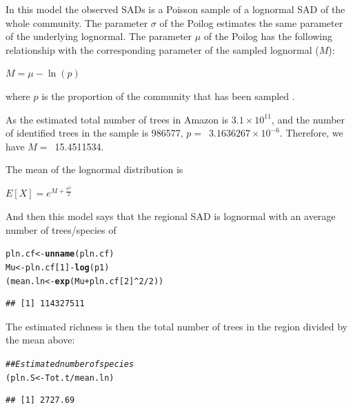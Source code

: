 \documentclass[12pt, A4]{article}\usepackage[]{graphicx}\usepackage[]{color}
\makeatletter
\newcommand{\hlnum}[1]{\textcolor[rgb]{0.686,0.059,0.569}{#1}}%
\newcommand{\hlcom}[1]{\textcolor[rgb]{0.678,0.584,0.686}{\textit{#1}}}%
\newcommand{\hlopt}[1]{\textcolor[rgb]{0,0,0}{#1}}%
\newcommand{\hlstd}[1]{\textcolor[rgb]{0.345,0.345,0.345}{#1}}%
\newcommand{\hlkwb}[1]{\textcolor[rgb]{0.69,0.353,0.396}{#1}}%
\newcommand{\hlkwd}[1]{\textcolor[rgb]{0.737,0.353,0.396}{\textbf{#1}}}%
\newenvironment{kframe}{%
 \def\at@end@of@kframe{}%
 \ifinner\ifhmode%
  \def\at@end@of@kframe{\end{minipage}}%
  \begin{minipage}{\columnwidth}%
 \fi\fi%
 \def\FrameCommand##1{\hskip\@totalleftmargin \hskip-\fboxsep
 \colorbox{shadecolor}{##1}\hskip-\fboxsep
     \hskip-\linewidth \hskip-\@totalleftmargin \hskip\columnwidth}%
 \MakeFramed {\advance\hsize-\width
   \@totalleftmargin\z@ \linewidth\hsize
   \@setminipage}}%
 {\par\unskip\endMakeFramed%
 \at@end@of@kframe}
\newenvironment{knitrout}{}{} %
\makeatother
\begin{document}
In this model the observed SADs is a Poisson sample of a lognormal SAD of the whole community.
The parameter $\sigma$ of the Poilog estimates the same parameter of the underlying lognormal.
The parameter $\mu$ of the Poilog has the following relationship with the corresponding parameter
of the sampled lognormal ($M$):

$ M = \mu - \ln(p)$

where $p$ is the proportion of the community that has been sampled
\citep{Bulmer1974,Saether2013}.

As the estimated total number of trees in  Amazon is $3.1 \times 10^{11}$, 
and the number of identified trees in the sample
is 986577, $p=$~\ensuremath{3.1636267\times 10^{-6}}.
Therefore, we have $M=$~15.4511534.

The mean of the lognormal distribution is 

$E[X] = e^{M + \frac{\sigma^2}{2}}$

And then this model says that the regional SAD is lognormal
with an average number of trees/species of

 
\begin{knitrout}
\color{fgcolor}\begin{kframe}
\begin{alltt}
\hlstd{pln.cf} \hlkwb{<-} \hlkwd{unname}\hlstd{(pln.cf)}
\hlstd{Mu} \hlkwb{<-} \hlstd{pln.cf[}\hlnum{1}\hlstd{]}\hlopt{-}\hlkwd{log}\hlstd{(p1)}
\hlstd{(mean.ln} \hlkwb{<-} \hlkwd{exp}\hlstd{(Mu} \hlopt{+} \hlstd{pln.cf[}\hlnum{2}\hlstd{]}\hlopt{^}\hlnum{2}\hlopt{/}\hlnum{2}\hlstd{))}
\end{alltt}
\begin{verbatim}
## [1] 114327511
\end{verbatim}
\end{kframe}
\end{knitrout}

The estimated richness is then the total number of trees in the region
divided by the mean above: 

 
\begin{knitrout}
\color{fgcolor}\begin{kframe}
\begin{alltt}
\hlcom{## Estimated number of species}
\hlstd{(pln.S} \hlkwb{<-} \hlstd{Tot.t}\hlopt{/}\hlstd{mean.ln)}
\end{alltt}
\begin{verbatim}
## [1] 2727.69
\end{verbatim}
\end{kframe}
\end{knitrout}
\end{document}
